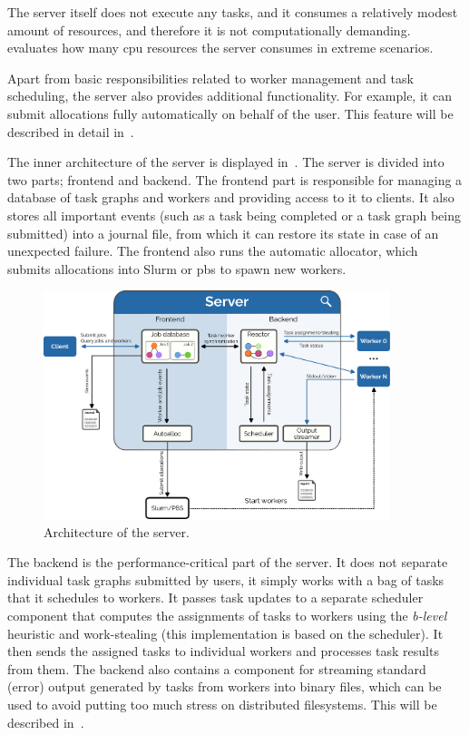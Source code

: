 The server itself does not execute any tasks, and it consumes a relatively modest amount of
resources, and therefore it is not computationally demanding.~ evaluates how
many \gls{cpu} resources the server consumes in extreme scenarios.

Apart from basic responsibilities related to worker management and task scheduling, the server also
provides additional functionality. For example, it can submit allocations fully automatically on
behalf of the user. This feature will be described in detail in~.

The inner architecture of the server is displayed in~. The server is divided
into two parts; frontend and backend. The frontend part is responsible for managing a database of
task graphs and workers and providing access to it to clients. It also stores all important events
(such as a task being completed or a task graph being submitted) into a journal file, from which it
can restore its state in case of an unexpected failure. The frontend also runs the automatic
allocator, which submits allocations into Slurm or \gls{pbs} to spawn new workers.

\begin{figure}[h]
	\centering
	\includegraphics[width=0.9\textwidth]{imgs/hq/server-architecture}
	\caption{Architecture of the \hyperqueue{} server.}
	\label{fig:hq-server-architecture}
\end{figure}

The backend is the performance-critical part of the server. It does not separate individual task
graphs submitted by users, it simply works with a bag of tasks that it schedules to workers. It
passes task updates to a separate scheduler component that computes the assignments of tasks to
workers using the \emph{b-level} heuristic and work-stealing (this implementation is based
on the \rsds{} scheduler). It then sends the assigned tasks to individual workers
and processes task results from them. The backend also contains a component for streaming standard
(error) output generated by tasks from workers into binary files, which can be used to avoid
putting too much stress on distributed filesystems. This will be described
in~.

